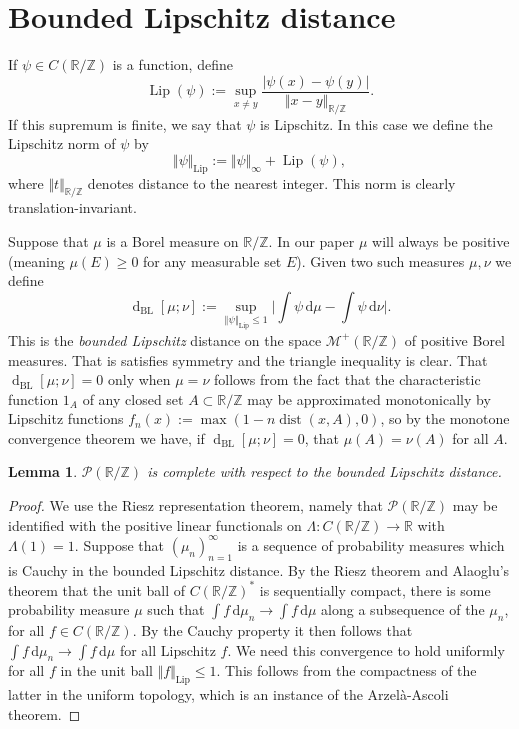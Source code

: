 \documentclass[11pt,reqno]{amsart}
\numberwithin{equation}{section}
\newtheorem{lemma}[theorem]{Lemma}
\theoremstyle{definition}
\theoremstyle{remark}
\newcommand{\dist}[2]{{\operatorname{d}_{\operatorname{BL}}[#1;#2]}}
\renewcommand{\le}{\leqslant}
\renewcommand{\ge}{\geqslant}
\newcommand\Z{\mathbb{Z}}
\newcommand\R{\mathbb{R}}
\newcommand\Lip{\operatorname{Lip}}
\begin{document}
\section{Bounded Lipschitz distance}\label{bl-app}
If $\psi \in C(\R/\Z)$ is a function, define \[ \Lip(\psi) := \sup_{x \ne y} \frac{|\psi(x) - \psi(y)|}{\Vert x - y \Vert_{\R/\Z}}.\] If this supremum is finite, we say that $\psi$ is Lipschitz. In this case we define the Lipschitz norm of $\psi$ by 
\[ \Vert \psi \Vert_{\Lip} := \Vert \psi \Vert_{\infty} + \Lip(\psi),\] where $\Vert t \Vert_{\R/\Z}$ denotes distance to the nearest integer. This norm is clearly translation-invariant.

Suppose that $\mu$ is a Borel measure on $\R/\Z$. In our paper $\mu$ will always be positive (meaning $\mu(E) \ge 0$ for any measurable set $E$). Given two such measures $\mu,\nu$ we define 
\[ \dist{\mu}{\nu} := \sup_{\Vert \psi \Vert_{\Lip} \le 1} \big| \int \psi \, \mathrm{d}\mu - \int \psi \, \mathrm{d}\nu\big|.\] This is the \emph{bounded Lipschitz} distance on the space $\mathcal{M}^+(\R/\Z)$ of positive Borel measures. That is satisfies symmetry and the triangle inequality is clear. That $\dist{\mu}{\nu} = 0$ only when $\mu = \nu$ follows from the fact that the characteristic function $1_A$ of any closed set $A \subset \R/\Z$ may be approximated monotonically by Lipschitz functions $f_n(x) := \max(1 - n \operatorname{dist}(x, A), 0)$, so by the monotone convergence theorem we have, if $\dist{\mu}{\nu} = 0$, that $\mu(A) = \nu(A)$ for all $A$. 




\begin{lemma}\label{completeness-measures}
$\mathcal{P}(\R/\Z)$ is complete with respect to the bounded Lipschitz distance.
\end{lemma}

\begin{proof}
We use the Riesz representation theorem, namely that $\mathcal{P}(\R/\Z)$ may be identified with the positive linear functionals on $\Lambda : C(\R/\Z) \rightarrow \R$ with $\Lambda(1) = 1$.
Suppose that $(\mu_n)_{n =1}^{\infty}$ is a sequence of probability measures which is Cauchy in the bounded Lipschitz distance. By the Riesz theorem and Alaoglu's theorem that the unit ball of $C(\R/\Z)^*$ is sequentially compact, there is some probability measure $\mu$ such that $\int f \, \mathrm{d}\mu_n \rightarrow \int f \, \mathrm{d}\mu$ along a subsequence of the $\mu_n$, for all $f \in C(\R/\Z)$. By the Cauchy property it then follows that $\int f \, \mathrm{d}\mu_n \rightarrow \int f \, \mathrm{d}\mu$ for all Lipschitz $f$. We need this convergence to hold uniformly for all $f$ in the unit ball $\Vert f \Vert_{\Lip} \le 1$. This follows from the compactness of the latter in the uniform topology, which is an instance of the Arzel\`a-Ascoli theorem.\end{proof}
\end{document}
